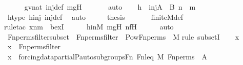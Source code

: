 \begin{isabellebody}
\ \ \ \ \isamarkupfalse%
\ gvnat\ inj{\isacharunderscore}{\kern0pt}def\ mgH\ \isanewline
\ \ \ \ \isamarkupfalse%
\ auto\isanewline
\isanewline
\ \ \isamarkupfalse%
\ {\isachardoublequoteopen}h\ {\isasymin}\ inj{\isacharparenleft}{\kern0pt}A\ {\isasymunion}\ B{\isacharcomma}{\kern0pt}\ n\ {\isacharhash}{\kern0pt}{\isacharplus}{\kern0pt}\ m{\isacharparenright}{\kern0pt}{\isachardoublequoteclose}\ \isamarkupfalse%
\ htype\ hinj\ inj{\isacharunderscore}{\kern0pt}def\ \isamarkupfalse%
\ auto\isanewline
\ \ \isamarkupfalse%
\ \isamarkupfalse%
\ {\isacharquery}{\kern0pt}thesis\ \isanewline
\ \ \ \ \isamarkupfalse%
\ finite{\isacharunderscore}{\kern0pt}M{\isacharunderscore}{\kern0pt}def\ \isanewline
\ \ \ \ \isamarkupfalse%
{\isacharparenleft}{\kern0pt}rule{\isacharunderscore}{\kern0pt}tac\ x{\isacharequal}{\kern0pt}{\isachardoublequoteopen}n{\isacharhash}{\kern0pt}{\isacharplus}{\kern0pt}m{\isachardoublequoteclose}\ \ bexI{\isacharparenright}{\kern0pt}\isanewline
\ \ \ \ \isamarkupfalse%
\ hinM\ mgH\ nfH\isanewline
\ \ \ \ \isamarkupfalse%
\ auto\isanewline
{}\isamarkupfalse%
%
\endisatagproof
{\isafoldproof}%
%
\isadelimproof
\isanewline
%
\endisadelimproof
\isanewline
{}\isamarkupfalse%
\ Fn{\isacharunderscore}{\kern0pt}perms{\isacharunderscore}{\kern0pt}filter{\isacharunderscore}{\kern0pt}subset\ {\isacharcolon}{\kern0pt}\ {\isachardoublequoteopen}Fn{\isacharunderscore}{\kern0pt}perms{\isacharunderscore}{\kern0pt}filter\ {\isasymsubseteq}\ Pow{\isacharparenleft}{\kern0pt}Fn{\isacharunderscore}{\kern0pt}perms{\isacharparenright}{\kern0pt}\ {\isasyminter}\ M{\isachardoublequoteclose}\isanewline
%
\isadelimproof
%
\endisadelimproof
%
\isatagproof
{}\isamarkupfalse%
{\isacharparenleft}{\kern0pt}rule\ subsetI{\isacharparenright}{\kern0pt}\isanewline
\ \ \isamarkupfalse%
\ x\ \isamarkupfalse%
\ {\isachardoublequoteopen}x\ {\isasymin}\ Fn{\isacharunderscore}{\kern0pt}perms{\isacharunderscore}{\kern0pt}filter{\isachardoublequoteclose}\ \isanewline
\ \ \isamarkupfalse%
\ \isamarkupfalse%
\ {\isachardoublequoteopen}x\ {\isasymin}\ forcing{\isacharunderscore}{\kern0pt}data{\isacharunderscore}{\kern0pt}partial{\isachardot}{\kern0pt}P{\isacharunderscore}{\kern0pt}auto{\isacharunderscore}{\kern0pt}subgroups{\isacharparenleft}{\kern0pt}Fn{\isacharcomma}{\kern0pt}\ Fn{\isacharunderscore}{\kern0pt}leq{\isacharcomma}{\kern0pt}\ M{\isacharcomma}{\kern0pt}\ Fn{\isacharunderscore}{\kern0pt}perms{\isacharparenright}{\kern0pt}{\isachardoublequoteclose}\ {\isacharparenleft}{\kern0pt}\ {\isacharquery}{\kern0pt}A{\isacharparenright}{\kern0pt}\isanewline

\end{isabellebody}
